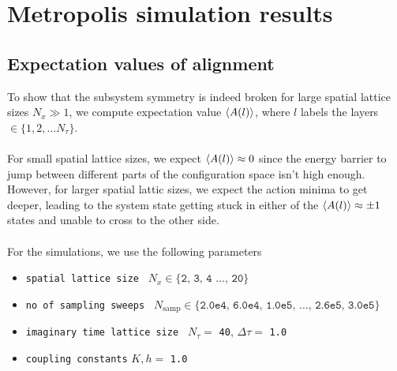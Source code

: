 \documentclass[../thesis_main.tex]{subfiles}
\begin{document}
\section{Metropolis simulation results}
\subsection{Expectation values of alignment}
To show that the subsystem symmetry is indeed broken for large spatial lattice sizes $N_x \gg 1$, we compute expectation value $\expval{A(l)}$, where $l$ labels the layers $\in \{1, 2, \ldots N_\tau\}$. ~\\~\\
For small spatial lattice sizes, we expect $\expval{A(l)} \approx 0$ since the energy barrier to jump between different parts of the configuration space isn't high enough. However, for larger spatial lattic sizes, we expect the action minima to get deeper, leading to the system state getting stuck in either of the $\expval{A(l)} \approx \pm 1$ states and unable to cross to the other side.~\\~\\
For the simulations, we use the following parameters
\begin{itemize}[label={}]
    \setlength{\itemsep}{0.1em}
    \item \texttt{spatial lattice size } $N_x \in \{ \texttt{2, 3, 4 $\ldots$, 20} \}$  
    \item \texttt{no of sampling sweeps } $N_\text{samp} \in \{\texttt{2.0e4, 6.0e4, 1.0e5, $\ldots$, 2.6e5, 3.0e5} \}$
    \item \texttt{imaginary time lattice size } $N_\tau = $ \texttt{40}, \: $\Delta \tau = $ \texttt{1.0}
    \item \texttt{coupling constants} $K, h = $ \texttt{1.0} 
\end{itemize}
\end{document}

